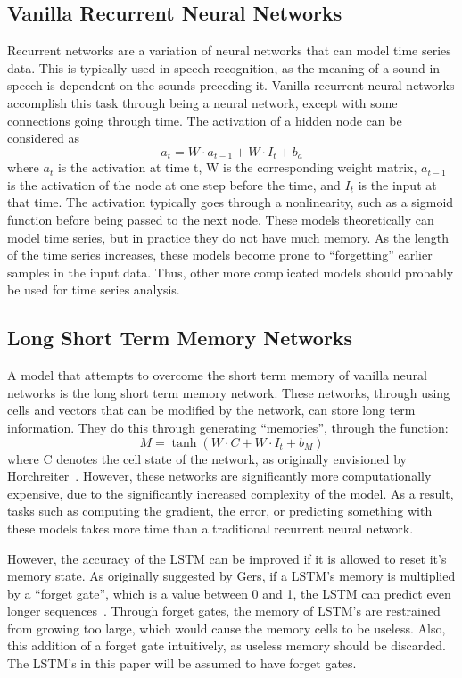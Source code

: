 \documentclass{article}
\begin{document}
\subsection{Vanilla Recurrent Neural Networks}
Recurrent networks are a variation of neural networks that can model time series
data. This is typically used in speech recognition, as the meaning of a sound in
speech is dependent on the sounds preceding it. Vanilla recurrent neural
networks accomplish this task through being a neural network, except with some
connections going through time.  The activation of a hidden node can be
considered as 
$$a_t = W\cdot a_{t-1} + W\cdot I_t + b_a$$
where $a_t$ is the activation at time t, W is the corresponding weight matrix,
$a_{t-1}$ is the activation of the node at one step before the time, and $I_t$
is the input at that time. The activation typically goes through a nonlinearity,
such as a sigmoid function before being passed to the next node. These models
theoretically can model time series, but in practice they do not have much
memory. As the length of the time series increases, these models become prone to
``forgetting'' earlier samples in the input data. Thus, other more complicated
models should probably be used for time series analysis.

\subsection{Long Short Term Memory Networks}
A model that attempts to overcome the short term memory of vanilla neural
networks is the long short term memory network. These networks, through using
cells and vectors that can be modified by the network, can store long term
information. They do this through generating ``memories'', through the function:
$$M = \tanh(W\cdot C + W\cdot I_t + b_M)$$ where C denotes the cell state of the
network, as originally envisioned by Horchreiter~\cite{lstm}. However, these
networks are significantly more computationally expensive, due to the
significantly increased complexity of the model. As a result, tasks such as
computing the gradient, the error, or predicting something with these models
takes more time than a traditional recurrent neural network.

However, the accuracy of the LSTM can be improved if it is allowed to reset
it's memory state. As originally suggested by Gers, if a LSTM's memory is
multiplied by a ``forget gate'', which is a value between 0 and 1, the LSTM can
predict even longer sequences~\cite{forget}. Through forget gates, the memory of
LSTM's are restrained from growing too large, which would cause the memory cells
to be useless. Also, this addition of a forget gate intuitively, as useless
memory should be discarded. The LSTM's in this paper will be assumed to have
forget gates.
\end{document}
